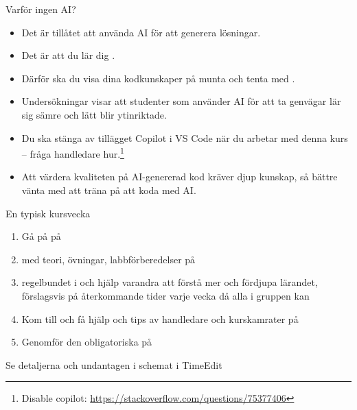 \begin{SlideExtra}{Varför ingen AI?}
\begin{itemize}
\item Det är  tillåtet att använda AI för att generera lösningar. 
\item Det är  att du lär dig .
\item Därför ska du visa dina kodkunskaper på munta och tenta med .
\item Undersökningar visar att studenter som använder AI för att ta genvägar lär sig sämre och lätt blir ytinriktade.
\item Du ska stänga av tillägget Copilot i VS Code  när du arbetar med denna kurs -- fråga handledare hur.\footnote{Disable copilot: \url{https://stackoverflow.com/questions/75377406}}
\item Att värdera kvaliteten på AI-genererad kod kräver djup kunskap, så bättre vänta med att träna på att koda med AI.

\end{itemize}

\end{SlideExtra}

\fi %

\begin{Slide}{En typisk kursvecka}
\begin{enumerate}
\item Gå på  på 
\item {}  med teori, övningar, labbförberedelser på  
\item {} regelbundet i  och hjälp varandra att förstå mer och fördjupa lärandet, förslagsvis på återkommande tider varje vecka då alla i gruppen kan
\item Kom till  och få hjälp och tips av handledare och kurskamrater på 
\item Genomför den obligatoriska  på 
\end{enumerate}
Se detaljerna och undantagen i schemat i TimeEdit
\end{Slide}

